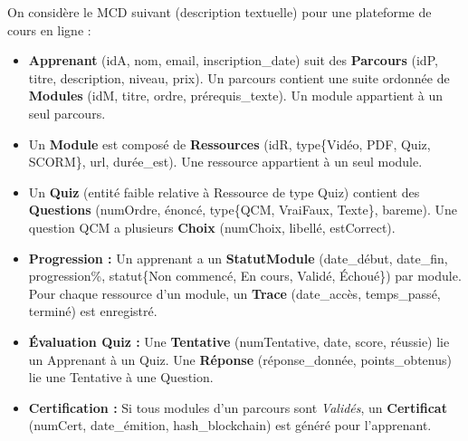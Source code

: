 \documentclass[11pt]{article}
\begin{document}
\begin{exercice}
On considère le MCD suivant (description textuelle) pour une plateforme de cours en ligne :
\begin{itemize}
    \item \textbf{Apprenant} (idA, nom, email, inscription\_date) suit des \textbf{Parcours} (idP, titre, description, niveau, prix). Un parcours contient une suite ordonnée de \textbf{Modules} (idM, titre, ordre, prérequis\_texte). Un module appartient à un seul parcours.
    \item Un \textbf{Module} est composé de \textbf{Ressources} (idR, type\{Vidéo, PDF, Quiz, SCORM\}, url, durée\_est). Une ressource appartient à un seul module.
    \item Un \textbf{Quiz} (entité faible relative à Ressource de type Quiz) contient des \textbf{Questions} (numOrdre, énoncé, type\{QCM, VraiFaux, Texte\}, bareme). Une question QCM a plusieurs \textbf{Choix} (numChoix, libellé, estCorrect).
    \item \textbf{Progression :} Un apprenant a un \textbf{StatutModule} (date\_début, date\_fin, progression\%, statut\{Non commencé, En cours, Validé, Échoué\}) par module. Pour chaque ressource d'un module, un \textbf{Trace} (date\_accès, temps\_passé, terminé) est enregistré.
    \item \textbf{Évaluation Quiz :} Une \textbf{Tentative} (numTentative, date, score, réussie) lie un Apprenant à un Quiz. Une \textbf{Réponse} (réponse\_donnée, points\_obtenus) lie une Tentative à une Question.
    \item \textbf{Certification :} Si tous modules d'un parcours sont \textit{Validés}, un \textbf{Certificat} (numCert, date\_émition, hash\_blockchain) est généré pour l'apprenant.
\end{itemize}


\end{exercice}
\end{document}
